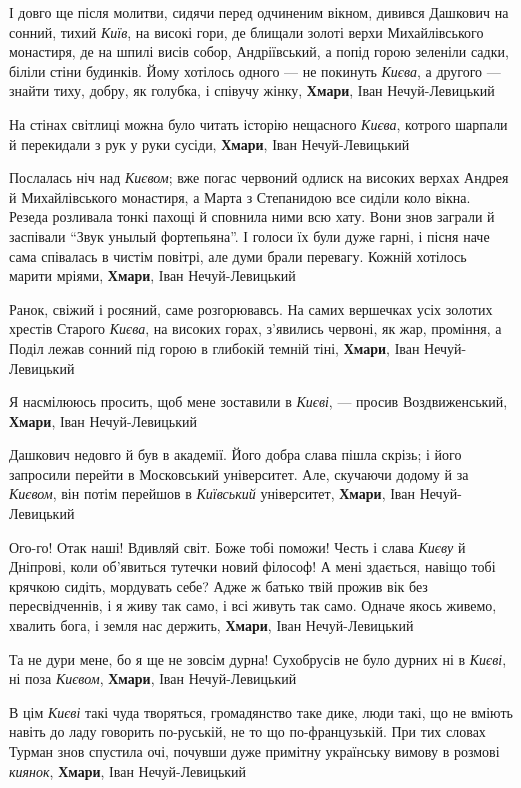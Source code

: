 І довго ще після молитви, сидячи перед одчиненим вікном, дивився Дашкович на
сонний, тихий \emph{Київ}, на високі гори, де блищали золоті верхи Михайлівського
монастиря, де на шпилі висів собор, Андріївський, а попід горою зеленіли садки,
біліли стіни будинків. Йому хотілось одного — не покинуть \emph{Києва}, а другого —
знайти тиху, добру, як голубка, і співучу жінку, \textbf{Хмари}, Іван Нечуй-Левицький

На стінах світлиці можна було читать історію нещасного \emph{Києва}, котрого шарпали й
перекидали з рук у руки сусіди, \textbf{Хмари}, Іван Нечуй-Левицький

Послалась ніч над \emph{Києвом}; вже погас червоний одлиск на високих верхах
Андрея й Михайлівського монастиря, а Марта з Степанидою все сиділи коло вікна.
Резеда розливала тонкі пахощі й сповнила ними всю хату. Вони знов заграли й
заспівали \enquote{Звук унылый фортепьяна}. І голоси їх були дуже гарні, і
пісня наче сама співалась в чистім повітрі, але думи брали перевагу. Кожній
хотілось марити мріями, \textbf{Хмари}, Іван Нечуй-Левицький

Ранок, свіжий і росяний, саме розгорювавсь. На самих вершечках усіх золотих
хрестів Старого \emph{Києва}, на високих горах, з'явились червоні, як жар,
проміння, а Поділ лежав сонний під горою в глибокій темній тіні,
\textbf{Хмари}, Іван Нечуй-Левицький

Я насмілююсь просить, щоб мене зоставили в \emph{Києві}, — просив
Воздвиженський, \textbf{Хмари}, Іван Нечуй-Левицький

Дашкович недовго й був в академії. Його добра слава пішла скрізь; і його
запросили перейти в Московський університет. Але, скучаючи додому й за
\emph{Києвом}, він потім перейшов в \emph{Київський} університет,
\textbf{Хмари}, Іван Нечуй-Левицький

Ого-го! Отак наші! Вдивляй світ. Боже тобі поможи! Честь і слава \emph{Києву} й
Дніпрові, коли об'явиться тутечки новий філософ! А мені здається, навіщо тобі
крячкою сидіть, мордувать себе? Адже ж батько твій прожив вік без
пересвідченнів, і я живу так само, і всі живуть так само. Одначе якось живемо,
хвалить бога, і земля нас держить, \textbf{Хмари}, Іван Нечуй-Левицький

Та не дури мене, бо я ще не зовсім дурна! Сухобрусів не було дурних ні в
\emph{Києві}, ні поза \emph{Києвом}, \textbf{Хмари}, Іван Нечуй-Левицький

В цім \emph{Києві} такі чуда творяться, громадянство таке дике, люди такі, що
не вміють навіть до ладу говорить по-руській, не то що по-французькій.  При тих
словах Турман знов спустила очі, почувши дуже примітну українську вимову в
розмові \emph{киянок}, \textbf{Хмари}, Іван Нечуй-Левицький

